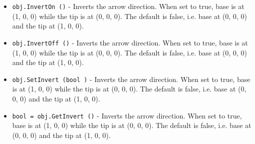 \begin{itemize}
\item  \verb|obj.InvertOn ()| -  Inverts the arrow direction. When set to true, base is at (1, 0, 0) while the
 tip is at (0, 0, 0). The default is false, i.e. base at (0, 0, 0) and the tip
 at (1, 0, 0).

\item  \verb|obj.InvertOff ()| -  Inverts the arrow direction. When set to true, base is at (1, 0, 0) while the
 tip is at (0, 0, 0). The default is false, i.e. base at (0, 0, 0) and the tip
 at (1, 0, 0).

\item  \verb|obj.SetInvert (bool )| -  Inverts the arrow direction. When set to true, base is at (1, 0, 0) while the
 tip is at (0, 0, 0). The default is false, i.e. base at (0, 0, 0) and the tip
 at (1, 0, 0).

\item  \verb|bool = obj.GetInvert ()| -  Inverts the arrow direction. When set to true, base is at (1, 0, 0) while the
 tip is at (0, 0, 0). The default is false, i.e. base at (0, 0, 0) and the tip
 at (1, 0, 0).

\end{itemize}
